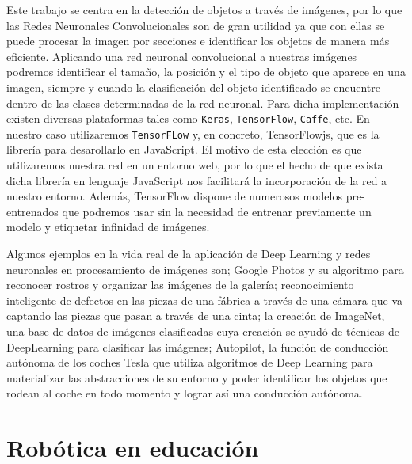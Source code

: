 \documentclass{report}
\begin{document}
Este trabajo se centra en la detección de objetos a través de imágenes, por lo que las Redes Neuronales Convolucionales son de gran utilidad ya que con ellas se puede procesar la imagen por secciones e identificar los objetos de manera más eficiente. Aplicando una red neuronal convolucional a nuestras imágenes podremos identificar el tamaño, la posición y el tipo de objeto que aparece en una imagen, siempre y cuando la clasificación del objeto identificado se encuentre dentro de las clases determinadas de la red neuronal. Para dicha implementación existen diversas plataformas tales como \texttt{Keras}, \texttt{TensorFlow}, \texttt{Caffe}, etc. En nuestro caso utilizaremos \texttt{TensorFLow} y, en concreto, TensorFlowjs, que es la librería para desarollarlo en JavaScript. El motivo de esta elección es que utilizaremos nuestra red en un entorno web, por lo que el hecho de que exista dicha librería en lenguaje JavaScript nos facilitará la incorporación de la red a nuestro entorno. Además, TensorFlow dispone de numerosos modelos pre-entrenados que podremos usar sin la necesidad de entrenar previamente un modelo y etiquetar infinidad de imágenes.

Algunos ejemplos en la vida real de la aplicación de Deep Learning y redes neuronales en procesamiento de imágenes son; Google Photos y su algoritmo para reconocer rostros y organizar las imágenes de la galería; reconocimiento inteligente de defectos en las piezas de una fábrica a través de una cámara que va captando las piezas que pasan a través de una cinta; la creación de ImageNet, una base de datos de imágenes clasificadas cuya creación se ayudó de técnicas de DeepLearning para clasificar las imágenes; Autopilot, la función de conducción autónoma de los coches Tesla que utiliza algoritmos de Deep Learning para materializar las abstracciones de su entorno y poder identificar los objetos que rodean al coche en todo momento y lograr así una conducción autónoma. 

\section{Robótica en educación}
\end{document}
